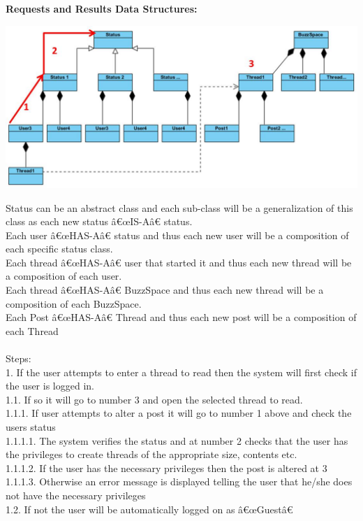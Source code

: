 \documentclass[a4paper,11pt]{article}
\begin{document}
\textbf{Requests and Results Data Structures:}
\begin{center}
\includegraphics[width=1\linewidth]{./Images/CRUDThread/Diagrams/5.jpg}\\
\end{center}
Status can be an abstract class and each sub-class will be a generalization of this class as each new status â€œIS-Aâ€ status.\\
Each user â€œHAS-Aâ€ status and thus each new user will be a composition of each specific status class.\\
Each thread â€œHAS-Aâ€ user that started it and thus each new thread will be a composition of each user.\\
Each thread â€œHAS-Aâ€ BuzzSpace and thus each new thread will be a composition of each BuzzSpace.\\
Each Post â€œHAS-Aâ€ Thread and thus each new post will be a composition of each Thread\\\\

Steps:\\
1.	If the user attempts to enter a thread to read then the system will first check if the user is logged in.\\
1.1.	If so it will go to number 3 and open the selected thread to read.\\
1.1.1.	If user attempts to alter a post it will go to number 1 above and check the users status\\
1.1.1.1.	The system verifies the status and at number 2 checks that the user has the privileges to create threads of the appropriate size, contents etc.\\
1.1.1.2.	If the user has the necessary privileges then the post is altered at 3\\
1.1.1.3.	Otherwise an error message is displayed telling the user that he/she does not have the necessary privileges \\
1.2.	If not the user will be automatically logged on as â€œGuestâ€
\end{document}

